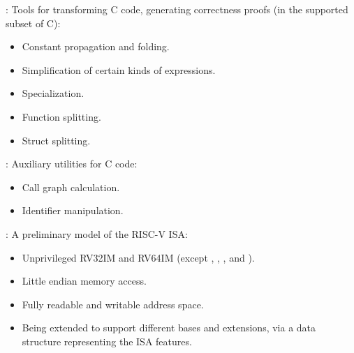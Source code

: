 
\begin{frame}

\newlibtitle

:
Tools for transforming C code,
generating correctness proofs (in the supported subset of C):
\begin{itemize}
\item Constant propagation and folding.
\item Simplification of certain kinds of expressions.
\item Specialization.
\item Function splitting.
\item Struct splitting.
\end{itemize}

\separation

:
Auxiliary utilities for C code:
\begin{itemize}
\item Call graph calculation.
\item Identifier manipulation.
\end{itemize}

\end{frame}


\begin{frame}

\newlibtitle

:
A preliminary model of the RISC-V ISA:
\begin{itemize}
\item Unprivileged RV32IM and RV64IM
      (except , , , and ).
\item Little endian memory access.
\item Fully readable and writable address space.
\item Being extended to support different bases and extensions,
      via a data structure representing the ISA features.
\end{itemize}

\end{frame}


